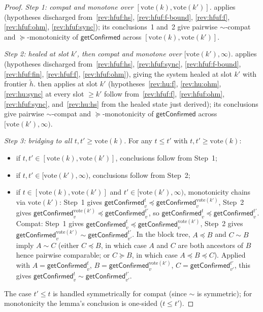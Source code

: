 \documentclass{article}
\newcommand{\vote}{\ensuremath{\mathrm{vote}}}
\newcommand{\comm}[1]{\ensuremath{\widetilde{#1}}}
\newcommand{\getConfirmed}{\textsf{getConfirmed}\xspace}
\theoremstyle{plain}
\theoremstyle{definition}
\theoremstyle{remark}
\begin{document}
\begin{proof}
\emph{Step 1: compat and monotone over $[\vote(k), \vote(k')]$.}
 applies (hypotheses discharged from~\ref{rev:hfuf:hs}, \ref{rev:hfuf:f-bound}, \ref{rev:hfuf:f}, \ref{rev:hfuf:ohm}, \ref{rev:hfuf:sync}); its conclusions~1 and~2 give pairwise $\sim$-compat and $\succeq$-monotonicity of $\getConfirmed$ across $[\vote(k), \vote(k')]$.

\emph{Step 2: healed at slot $k'$, then compat and monotone over $[\vote(k'), \infty)$.}
 applies (hypotheses discharged from~\ref{rev:hfuf:hs}, \ref{rev:hfuf:sync}, \ref{rev:hfuf:f-bound}, \ref{rev:hfuf:fin}, \ref{rev:hfuf:f}, \ref{rev:hfuf:ohm}), giving the system healed at slot $k'$ with frontier $\comm{h}$.
 then applies at slot $k'$ (hypotheses~\ref{rev:hu:f}, \ref{rev:hu:ohm}, \ref{rev:hu:sync} at every slot $\geq k'$ follow from~\ref{rev:hfuf:f}, \ref{rev:hfuf:ohm}, \ref{rev:hfuf:sync}, and~\ref{rev:hu:hs} from the healed state just derived);
its conclusions give pairwise $\sim$-compat and $\succeq$-monotonicity of $\getConfirmed$ across $[\vote(k'), \infty)$.

\emph{Step 3: bridging to all $t, t' \geq \vote(k)$.}
For any $t \leq t'$ with $t, t' \geq \vote(k)$:
\begin{itemize}
  \item if $t, t' \in [\vote(k), \vote(k')]$, conclusions follow from Step~1;
  \item if $t, t' \in [\vote(k'), \infty)$, conclusions follow from Step~2;
  \item if $t \in [\vote(k), \vote(k')]$ and $t' \in [\vote(k'), \infty)$, monotonicity chains via $\vote(k')$:
    Step~1 gives $\getConfirmed_v^t \preceq \getConfirmed_v^{\vote(k')}$, Step~2 gives $\getConfirmed_v^{\vote(k')} \preceq \getConfirmed_v^{t'}$, so $\getConfirmed_v^t \preceq \getConfirmed_v^{t'}$.
    Compat: Step~1 gives $\getConfirmed_v^t \preceq \getConfirmed_v^{\vote(k')}$, Step~2 gives $\getConfirmed_v^{\vote(k')} \sim \getConfirmed_{v'}^{t'}$. In the block tree, $A \preceq B$ and $C \sim B$ imply $A \sim C$ (either $C \preceq B$, in which case $A$ and $C$ are both ancestors of $B$ hence pairwise comparable; or $C \succeq B$, in which case $A \preceq B \preceq C$). Applied with $A = \getConfirmed_v^t$, $B = \getConfirmed_v^{\vote(k')}$, $C = \getConfirmed_{v'}^{t'}$, this gives $\getConfirmed_v^t \sim \getConfirmed_{v'}^{t'}$.
\end{itemize}
The case $t' \leq t$ is handled symmetrically for compat (since $\sim$ is symmetric); for monotonicity the lemma's conclusion is one-sided ($t \leq t'$).
\end{proof}
\end{document}
